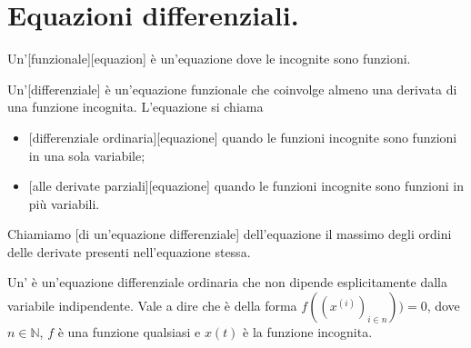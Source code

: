\section{Equazioni differenziali.}
\label{CalcoloDifferenziale_EquazioniAlleDerivateParzialiEEquazioniDifferenziali}
\begin{Definition}
	Un'[funzionale][equazion] \`e un'equazione dove le incognite sono funzioni.
\end{Definition}
\begin{Definition}
	Un'[differenziale] \`e un'equazione funzionale che coinvolge almeno una derivata di una funzione incognita. L'equazione si chiama
	\begin{itemize}
		\item {}[differenziale ordinaria][equazione] quando le funzioni incognite sono funzioni in una sola variabile;
		\item {}[alle derivate parziali][equazione] quando le funzioni incognite sono funzioni in pi\`u variabili.
	\end{itemize}
	Chiamiamo [di un'equazione differenziale] dell'equazione il massimo degli ordini delle derivate presenti nell'equazione stessa.
\end{Definition}
\begin{Definition}
	Un' \`e un'equazione differenziale ordinaria che non dipende esplicitamente dalla variabile indipendente. Vale a dire che \`e della forma $f((x^{(i)})_{i \in n})) = 0$, dove $n \in \mathbb{N}$, $f$ \`e una funzione qualsiasi e $x(t)$ \`e la funzione incognita.
\end{Definition}
